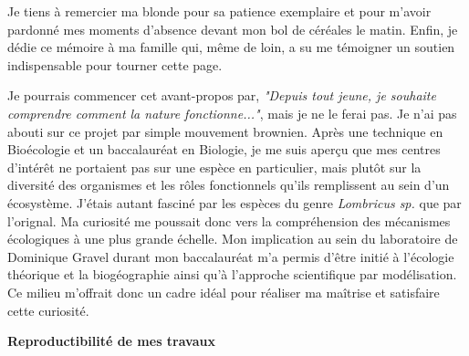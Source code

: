 Je tiens à remercier ma blonde pour sa patience exemplaire et pour m'avoir pardonné mes moments
d'absence devant mon bol de céréales le matin. Enfin, je dédie ce mémoire à ma famille qui, même de
loin, a su me témoigner un soutien indispensable pour tourner cette page.


\avantpropos


Je pourrais commencer cet avant-propos par, \textit{"Depuis tout jeune, je souhaite comprendre
comment la nature fonctionne..."}, mais je ne le ferai pas. Je n'ai pas abouti sur ce projet par
simple mouvement brownien. Après une technique en Bioécologie et un baccalauréat en Biologie, je me
suis aperçu que mes centres d'intérêt ne portaient pas sur une espèce en particulier, mais plutôt
sur la diversité des organismes et les rôles fonctionnels qu'ils remplissent au sein d'un
écosystème. J'étais autant fasciné par les espèces du genre \textit{Lombricus sp.} que par
l'orignal. Ma curiosité me poussait donc vers la compréhension des mécanismes écologiques à une plus
grande échelle. Mon implication au sein du laboratoire de Dominique Gravel durant mon baccalauréat
m'a permis d'être initié à l'écologie théorique et la biogéographie ainsi qu'à l'approche
scientifique par modélisation. Ce milieu m'offrait donc un cadre idéal pour réaliser ma
maîtrise et satisfaire cette curiosité.

\noindent\textbf{Reproductibilité de mes travaux}

